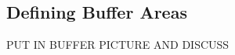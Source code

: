\documentclass[12pt]{article}
\begin{document}
\subsection{Defining Buffer Areas}








PUT IN BUFFER PICTURE AND DISCUSS









%
















\end{document}
